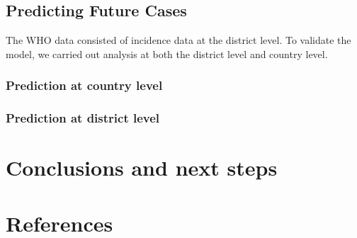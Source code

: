 \documentclass[11pt,]{article}
\begin{document}
\subsection{Predicting Future Cases}\label{predicting-future-cases}

The WHO data consisted of incidence data at the district level. To
validate the model, we carried out analysis at both the district level
and country level.

\subsubsection{Prediction at country level}

\subsubsection{Prediction at district level}


\section{Conclusions and next steps}\label{sec:conclusions}







\newpage
\section*{References}

\end{document}
